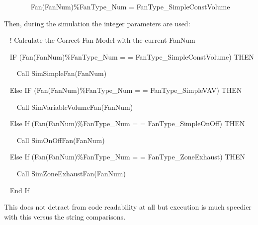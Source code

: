 ~~~~~~~ Fan(FanNum)\%FanType\_Num = FanType\_SimpleConstVolume

Then, during the simulation the integer parameters are used:

~ ! Calculate the Correct Fan Model with the current FanNum

~ IF (Fan(FanNum)\%FanType\_Num = = FanType\_SimpleConstVolume) THEN

~~~ Call SimSimpleFan(FanNum)

~ Else IF (Fan(FanNum)\%FanType\_Num = = FanType\_SimpleVAV) THEN

~~~ Call SimVariableVolumeFan(FanNum)

~ Else If (Fan(FanNum)\%FanType\_Num = = FanType\_SimpleOnOff) THEN

~~~ Call SimOnOffFan(FanNum)

~ Else If (Fan(FanNum)\%FanType\_Num = = FanType\_ZoneExhaust) THEN

~~~ Call SimZoneExhaustFan(FanNum)

~ End If

This does not detract from code readability at all but execution is much speedier with this versus the string comparisons.
